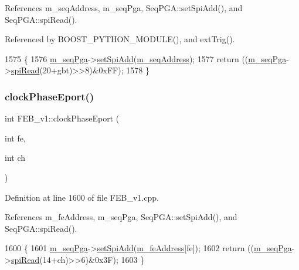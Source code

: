 References m\+\_\+seq\+Address, m\+\_\+seq\+Pga, Seq\+P\+G\+A\+::set\+Spi\+Add(), and Seq\+P\+G\+A\+::spi\+Read().



Referenced by B\+O\+O\+S\+T\+\_\+\+P\+Y\+T\+H\+O\+N\+\_\+\+M\+O\+D\+U\+L\+E(), and ext\+Trig().


\begin{DoxyCode}
1575                                    \{
1576   \hyperlink{classFEB__v1_a6c7804ac86796f233a8393043adf2e77}{m\_seqPga}->\hyperlink{classSeqPGA_ac998ce3a6d9b5f2e88cc8393f8c1df53}{setSpiAdd}(\hyperlink{classFEB__v1_a1c1eb093fd1733b9510fcf8bc5c7ad08}{m\_seqAddress});
1577   \textcolor{keywordflow}{return} ((\hyperlink{classFEB__v1_a6c7804ac86796f233a8393043adf2e77}{m\_seqPga}->\hyperlink{classSeqPGA_ab3d0e5e5d4014bc7a92588a76b8713d4}{spiRead}(20+gbt)>>8)&0xFF);
1578 \}
\end{DoxyCode}
\mbox{\label{classFEB__v1_aab32d0b274dfb55f1c2894ff3d08eaba}} 
\subsubsection{\texorpdfstring{clock\+Phase\+Eport()}{clockPhaseEport()}\hspace{0.1cm}{\footnotesize\ttfamily [2/2]}}
{\footnotesize\ttfamily int F\+E\+B\+\_\+v1\+::clock\+Phase\+Eport (\begin{DoxyParamCaption}\item[{int}]{fe,  }\item[{int}]{ch }\end{DoxyParamCaption})}



Definition at line 1600 of file F\+E\+B\+\_\+v1.\+cpp.



References m\+\_\+fe\+Address, m\+\_\+seq\+Pga, Seq\+P\+G\+A\+::set\+Spi\+Add(), and Seq\+P\+G\+A\+::spi\+Read().


\begin{DoxyCode}
1600                                           \{
1601   \hyperlink{classFEB__v1_a6c7804ac86796f233a8393043adf2e77}{m\_seqPga}->\hyperlink{classSeqPGA_ac998ce3a6d9b5f2e88cc8393f8c1df53}{setSpiAdd}(\hyperlink{classFEB__v1_a4e1945c2d5b434125f375e9d0fc6d99f}{m\_feAddress}[fe]);
1602   \textcolor{keywordflow}{return} ((\hyperlink{classFEB__v1_a6c7804ac86796f233a8393043adf2e77}{m\_seqPga}->\hyperlink{classSeqPGA_ab3d0e5e5d4014bc7a92588a76b8713d4}{spiRead}(14+ch)>>6)&0x3F);
1603 \}
\end{DoxyCode}
\mbox{\label{classFEB__v1_a6bca4320bd3bbbc32efc81097f33421a}} 
